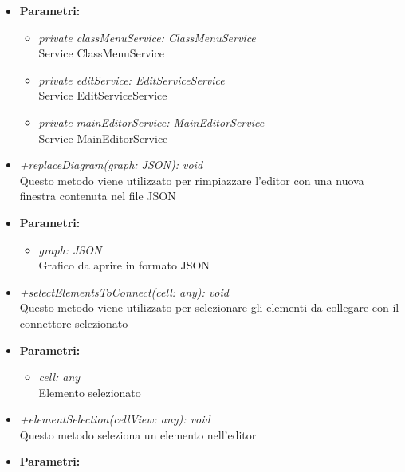 \begin{itemize}
\begin{itemize}
          				\item \textbf{Parametri:}\\
            				\begin{itemize}
            					\item \emph{private classMenuService: ClassMenuService}\\
            					Service ClassMenuService
            					\item \emph{private editService: EditServiceService}\\
            					Service EditServiceService
            					\item \emph{private mainEditorService: MainEditorService}\\
            					Service MainEditorService
            				\end{itemize}
          				\item \emph{+replaceDiagram(graph: JSON): void}\\
          				Questo metodo viene utilizzato per rimpiazzare l'editor con una nuova finestra contenuta nel file JSON
          				\item \textbf{Parametri:}\\
            				\begin{itemize}
            					\item \emph{graph: JSON}\\
            					Grafico da aprire in formato JSON
            				\end{itemize}
          				\item \emph{+selectElementsToConnect(cell: any): void}\\  
          				Questo metodo viene utilizzato per selezionare gli elementi da collegare con il connettore selezionato
          				\item \textbf{Parametri:}\\
            				\begin{itemize}
            					\item \emph{cell: any}\\
            					Elemento selezionato
            				\end{itemize}
            			\item \emph{+elementSelection(cellView: any): void}\\
            			Questo metodo seleziona un elemento nell'editor
            			\item \textbf{Parametri:}\\
            				\begin{itemize}

\end{itemize}
\end{itemize}
\end{itemize}
